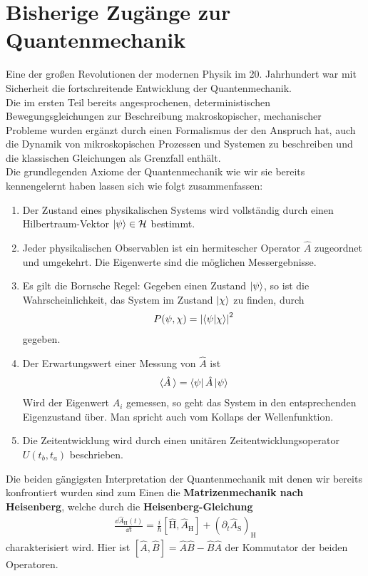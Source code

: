 \section{Bisherige Zugänge zur Quantenmechanik}
Eine der großen Revolutionen der modernen Physik im 20. Jahrhundert war mit Sicherheit die fortschreitende Entwicklung der Quantenmechanik. \\
Die im ersten Teil bereits angesprochenen, deterministischen Bewegungsgleichungen zur Beschreibung makroskopischer, mechanischer Probleme wurden ergänzt durch einen Formalismus der den Anspruch hat, auch die Dynamik von mikroskopischen Prozessen und Systemen zu beschreiben und die klassischen Gleichungen als Grenzfall enthält. \\
Die grundlegenden Axiome der Quantenmechanik wie wir sie bereits kennengelernt haben lassen sich wie folgt zusammenfassen:
\begin{enumerate}
	\item Der Zustand eines physikalischen Systems wird vollständig durch einen Hilbertraum-Vektor $\ket{\psi} \in \mathcal{H}$ bestimmt.
	\item Jeder physikalischen Observablen ist ein hermitescher Operator $\hat{A}$ zugeordnet und umgekehrt. Die Eigenwerte sind die möglichen Messergebnisse.
	\item Es gilt die Bornsche Regel: Gegeben einen Zustand $\ket{\psi} $, so ist die Wahrscheinlichkeit, das System im Zustand $\ket{\chi}$ zu finden, durch
	\begin{align}
		P(\psi, \chi) = \abs{\braket{\psi}{\chi}}^2
	\end{align}
	gegeben.
	\item Der Erwartungswert einer Messung von $\hat{A}$ ist 
	\begin{align}
		\langle \hat{A} \hspace{2pt} \rangle = \bra{\psi}\hat{A}\ket{\psi}
	\end{align}
 	 Wird der Eigenwert $A_i$ gemessen, so geht das System in den entsprechenden Eigenzustand über. Man spricht auch vom Kollaps der Wellenfunktion.
 	 \item  Die Zeitentwicklung wird durch einen unitären Zeitentwicklungsoperator $U(t_b, t_a)$ beschrieben.
\end{enumerate}
Die beiden gängigsten Interpretation der Quantenmechanik mit denen wir bereits konfrontiert wurden sind zum Einen die \textbf{Matrizenmechanik nach Heisenberg}, welche durch die \textbf{Heisenberg-Gleichung}
\begin{align}
	\frac{\dd\hat{A}_{\text{H}}(t)}{\dd t} = \frac{i}{\hbar}\left[\hat{\text{H}},\hat{A}_{\text{H}}\right] + \left(\partial_t \hat{A}_{\text{S}}\right)_{\text{H}}
\end{align}
 charakterisiert wird. Hier ist $\left[\hat{A},\hat{B}\right] = \hat{A}\hat{B} - \hat{B}\hat{A}$ der Kommutator der beiden Operatoren. \\
 
